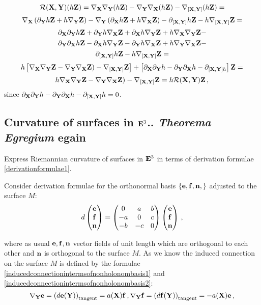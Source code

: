 \documentclass[12pt]{article}
\theoremstyle{theorem}
\numberwithin{equation}{section}
\begin{document}
{        $$
         {\cal R}({\bf X},{\bf Y})(h{\bf Z})=
    \nabla_{{\bf X}}\nabla_{\bf Y}(h{\bf Z})-\nabla_{{\bf Y}}\nabla_{\bf X}(h{\bf Z})-
   \nabla_{[{\bf X},{\bf Y}]}(h{\bf Z})=
        $$
        $$
     \nabla_{\bf X}\left(\partial_{\bf Y} h{\bf Z}+h\nabla_{\bf Y}{\bf Z}\right)-\nabla_{\bf Y}\left(\partial_{\bf X} h{\bf Z}+h\nabla_{\bf X}{\bf Z}\right)-
     \partial_{[{\bf X},{\bf Y}]}h {\bf Z}-h\nabla_{[{\bf X},{\bf Y}]}{\bf Z}=
        $$
        $$
    \partial_{\bf X}\partial_{\bf Y} h{\bf Z}+\partial_{\bf Y} h\nabla_{\bf X}{\bf Z}+
    \partial_{\bf X} h\nabla_{\bf Y}{\bf Z}+
    h\nabla_{\bf X}\nabla_{\bf Y} {\bf Z}-
        $$
        $$
        \partial_{\bf Y}\partial_{\bf X} h{\bf Z}-\partial_{\bf X} h\nabla_{\bf Y}{\bf Z}-
    \partial_{\bf Y} h\nabla_{\bf X}{\bf Z}+
    h\nabla_{\bf Y}\nabla_{\bf X} {\bf Z}-
        $$
        $$
      \partial_{[{\bf X},{\bf Y}]}h {\bf Z}-h\nabla_{[{\bf X},{\bf Y}]}{\bf Z}=
        $$
        $$
    h\left[\nabla_{{\bf X}}\nabla_{\bf Y}{\bf Z}-\nabla_{{\bf Y}}\nabla_{\bf X}{\bf Z})-
   \nabla_{[{\bf X},{\bf Y}]}{\bf Z}\right]+\left[\partial_{\bf X}\partial_{\bf Y} h-\partial_{\bf Y}\partial_{\bf X} h-\partial_{[{\bf X},{\bf Y}]h}\right]{\bf Z}=
        $$
        $$
h\nabla_{{\bf X}}\nabla_{\bf Y}{\bf Z}-\nabla_{{\bf Y}}\nabla_{\bf X}{\bf Z})-
   \nabla_{[{\bf X},{\bf Y}]}{\bf Z}=h{\cal R}({\bf X},{\bf Y}){\bf Z}\,,
        $$
   since $\partial_{\bf X}\partial_{\bf Y} h-\partial_{\bf Y}\partial_{\bf X} h-\partial_{[{\bf X},{\bf Y}]}h=0$.




\subsection {Curvature of surfaces in ${\bf E}^3$.. {\it Theorema Egregium} egain}

  Express Riemannian curvature of surfaces in ${\bf E}^3$ in terms of derivation formulae \eqref{derivationformulae1}.

   Consider derivation formulae for the orthonormal basis $\{{\bf e},{\bf f},{\bf n},\}$ adjusted to the surface $M$:
                      \begin{equation}\label{derivationformulae1}
                    d\begin{pmatrix}
                    {\bf e}\cr{\bf f}\cr{\bf n}\cr
                    \end{pmatrix}=
                    \begin{pmatrix}
                    0&a&b\cr -a&0&c\cr -b&-c&0\cr
                    \end{pmatrix}
                 \begin{pmatrix}
                    {\bf e}\cr{\bf f}\cr{\bf n}\cr
                    \end{pmatrix}\,,
                       \end{equation}

where as usual ${\bf e},{\bf f},{\bf n}$ vector fields of unit length which are  orthogonal
to each other and ${\bf n}$ is orthogonal to the surface $M$.  As we know the induced
connection on the surface $M$ is defined by the formulae \eqref{inducedconnectionintermsofnonholonombasis1}
and \eqref{inducedconnectionintermsofnonholonombasis2}:
   \begin{equation}\label{inducedconnectionintermsofnonholonombasis11}
        \nabla_{\bf Y} {\bf e}=\left(d{\bf e}({\bf Y})\right)_{\rm tangent}=a({\bf X}){\bf f}\,,
        \nabla_{\bf Y} {\bf f}=\left(d{\bf f}({\bf Y})\right)_{\rm tangent}=-a({\bf X}){\bf e}\,,
        \end{equation}

}
\end{document}
